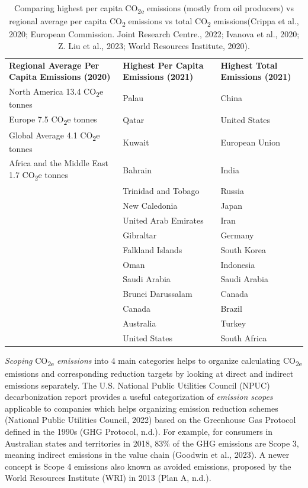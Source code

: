 \documentclass[
  letterpaper,
  DIV=11,
  numbers=noendperiod]{scrartcl}
\begin{document}
\begin{longtable}[]{@{}
  >{\raggedright\arraybackslash}p{}
  >{\raggedright\arraybackslash}p{}
  >{\raggedright\arraybackslash}p{}@{}}
\caption{Comparing highest per capita CO\textsubscript{2e} emissions
(mostly from oil producers) vs regional average per capita
CO\textsubscript{2} emissions vs total CO\textsubscript{2}
emissions(Crippa et al., 2020; European Commission. Joint Research
Centre., 2022; Ivanova et al., 2020; Z. Liu et al., 2023; World
Resources Institute, 2020).}\tabularnewline
\toprule\noalign{}
\endfirsthead
\endhead
\bottomrule\noalign{}
\endlastfoot
\textbf{Regional Average Per Capita Emissions (2020)} & \textbf{Highest
Per Capita Emissions (2021)} & \textbf{Highest Total Emissions
(2021)} \\
North America 13.4 CO\textsubscript{2}e tonnes & Palau & China \\
Europe 7.5 CO\textsubscript{2}e tonnes & Qatar & United States \\
Global Average 4.1 CO\textsubscript{2}e tonnes & Kuwait & European
Union \\
Africa and the Middle East 1.7 CO\textsubscript{2}e tonnes & Bahrain &
India \\
& Trinidad and Tobago & Russia \\
& New Caledonia & Japan \\
& United Arab Emirates & Iran \\
& Gibraltar & Germany \\
& Falkland Islands & South Korea \\
& Oman & Indonesia \\
& Saudi Arabia & Saudi Arabia \\
& Brunei Darussalam & Canada \\
& Canada & Brazil \\
& Australia & Turkey \\
& United States & South Africa \\
\end{longtable}

\emph{Scoping} CO\textsubscript{2e} \emph{emissions} into 4 main
categories helps to organize calculating CO\textsubscript{2e} emissions
and corresponding reduction targets by looking at direct and indirect
emissions separately. The U.S. National Public Utilities Council (NPUC)
decarbonization report provides a useful categorization of
\emph{emission scopes} applicable to companies which helps organizing
emission reduction schemes (National Public Utilities Council, 2022)
based on the Greenhouse Gas Protocol defined in the 1990s (GHG Protocol,
n.d.). For example, for consumers in Australian states and territories
in 2018, 83\% of the GHG emissions are Scope 3, meaning indirect
emissions in the value chain (Goodwin et al., 2023). A newer concept is
Scope 4 emissions also known as avoided emissions, proposed by the World
Resources Institute (WRI) in 2013 (Plan A, n.d.).
\end{document}
